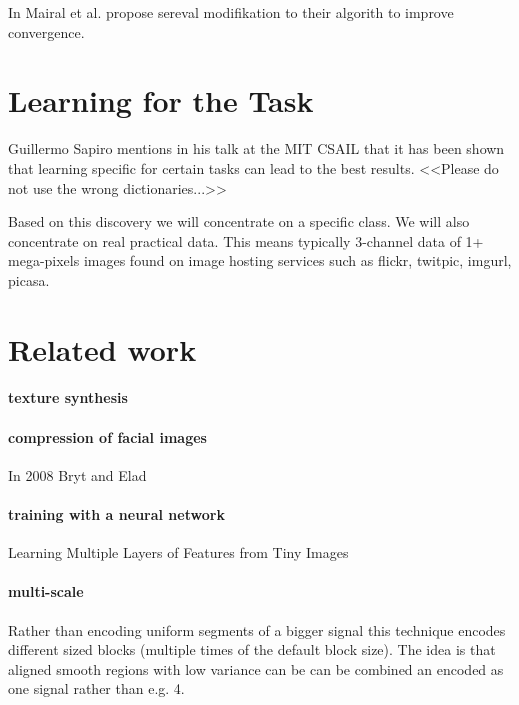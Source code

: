 In \cite{Mairal2010} Mairal et al. propose sereval modifikation to their algorith to improve convergence.



\section{Learning for the Task}
\label{sec:learnForTheTask}
Guillermo Sapiro mentions in his talk \cite{sapiroSlides} at the MIT CSAIL
that it has been shown that learning specific for certain tasks can lead to the
best results. <<Please do not use the wrong dictionaries...>>

Based on this discovery we will concentrate on a specific class. 
We will also concentrate on real practical data. This means typically 3-channel
data of 1+ mega-pixels images found on image hosting services such as flickr,
twitpic, imgurl, picasa.


\section{Related work}




\paragraph{texture synthesis}

\paragraph{compression of facial images}
In 2008 Bryt and Elad \cite{Bryt2008} 

\paragraph{training with a neural network}
Learning Multiple Layers of Features from Tiny Images \cite{Krizhevsky2009}


\paragraph{multi-scale}
Rather than encoding uniform segments of a bigger signal this technique
encodes different sized blocks (multiple times of the default block size). The
idea is that aligned smooth regions with low variance can be can be combined an
encoded as one signal rather than e.g. 4. \cite{saprioSlides}\cite{Mairal2007}

